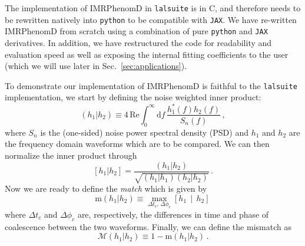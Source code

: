 \documentclass[twocolumn]{aastex631}
\newcommand{\jax}{\texttt{JAX}\xspace}
\newcommand{\lalsuite}{\texttt{lalsuite}\xspace}
\begin{document}
The implementation of IMRPhenomD in \lalsuite is in C, and therefore needs to be rewritten natively into \texttt{python} to be compatible with \jax.
We have re-written IMRPhenomD from scratch using a combination of pure \texttt{python} and \jax derivatives.
In addition, we have restructured the code for readability and evaluation speed as well as exposing the internal fitting coefficients to the user (which we will use later in Sec.~\ref{sec:applications}).

To demonstrate our implementation of IMRPhenomD is faithful to the \lalsuite implementation, we start by defining the noise weighted inner product:
\begin{equation}
    \label{eq:inner_prod}
    \left(h_1|h_2\right) \equiv 4 \, \mathrm{Re} \int^{\infty}_{0} \mathrm{d} f \, \frac{ h^*_1(f) h_2(f)}{S_n(f)}\, ,
\end{equation}
where $S_n$ is the (one-sided) noise power spectral density (PSD) and $h_1$ and $h_2$ are the frequency domain waveforms which are to be compared.
We can then normalize the inner product through
\begin{equation}
    \left[h_1|h_2\right] = \frac{\left(h_1|h_2\right)}{\sqrt{\left(h_1|h_1\right)\left(h_2|h_2\right)}}\, .
\end{equation}
Now we are ready to define the \textit{match} which is given by 
\begin{equation}
    \mathrm{m}(h_1|h_2) \equiv \max_{\Delta t_c,\, \Delta \phi_c} \left[h_1 \, \middle| \, h_2 \right]\,
\end{equation}
where $\Delta t_c$ and $\Delta \phi_c$ are, respectively, the differences in time and phase of coalescence between the two waveforms.
Finally, we can define the mismatch as 
\begin{equation}
    \label{eq:mismatch_1}
	\mathcal{M}(h_1|h_2) \equiv 1- \mathrm{m}(h_1|h_2)\,.
\end{equation}
\end{document}
